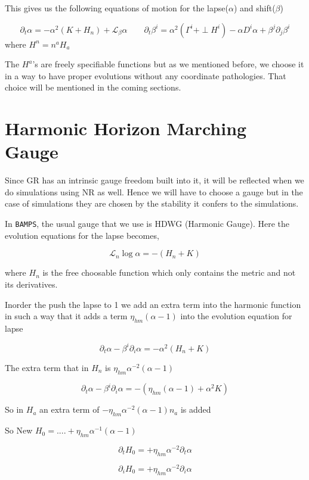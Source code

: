 This gives us the following equations of motion for the lapse($\alpha$) and shift($\beta$)

\begin{equation}
\partial_t \alpha = -\alpha^2 (K + H_n) + \mathcal{L}_\beta \alpha
\qquad \partial_t \beta^i = \alpha^2 (\Gamma^i + \perp H^i) - \alpha D^i \alpha + \beta^j \partial_j \beta^i
\label{lapse=shift}
\end{equation}
where $H^n= n^a H_a$

The $H^a$'s are freely specifiable functions but as we mentioned before, we choose it in a way to have proper evolutions without any coordinate pathologies. That choice will be mentioned in the coming sections.

\section{Harmonic Horizon Marching Gauge}
\label{HHMG}
Since GR has an intrinsic gauge freedom built into it, it will be reflected when we do simulations using NR as well. Hence we will have to choose a gauge but in the case of simulations they are chosen by the stability it confers to the simulations.

In \texttt{BAMPS}, the usual gauge that we use is HDWG (Harmonic Gauge). Here the evolution equations for the lapse becomes,

\[
\mathcal{L}_n \log \alpha = - (H_n +K)
\]

where $H_n$ is the free choosable function which only contains the metric and not its derivatives.

Inorder the push the lapse to 1 we add an extra term into the harmonic function in such a way that it adds a term $\eta_{hm}(\alpha-1)$ into the evolution equation for lapse

\[
\partial_t \alpha -\beta^i \partial_i \alpha= -\alpha^2(H_n + K)
\]

The extra term that in $H_n$ is $\eta_{hm} \alpha^{-2} (\alpha-1)$

\[
\partial_t \alpha -\beta^i \partial_i \alpha= -(\eta_{hm} (\alpha-1) + \alpha^2 K)
\]

So in $H_a$ an extra term of $-\eta_{hm} \alpha^{-2} (\alpha - 1) n_a$ is added

So New $H_0=.... + \eta_{hm} \alpha^{-1} (\alpha-1)$

\[
\partial_t H_0 = +\eta_{hm} \alpha^{-2} \partial_t \alpha
\]

\[
\partial_i H_0 = +\eta_{hm} \alpha^{-2} \partial_i \alpha
\]